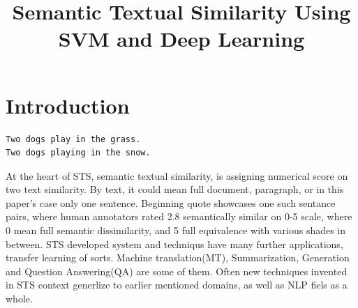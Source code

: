 \documentclass[10pt, a4paper]{article}
\title{Semantic Textual Similarity Using SVM and Deep Learning}
\begin{document}
\maketitleabstract

\section{Introduction}

\begin{verbatim}
Two dogs play in the grass.
Two dogs playing in the snow.
\end{verbatim}
At the heart of STS, semantic textual similarity, is assigning numerical score on two text similarity. By text, it could mean full document, paragraph, or in this paper's case only one sentence. Beginning quote showcases one such sentance pairs, where human annotators rated 2.8 semantically similar on 0-5 scale, where 0 mean full semantic dissimilarity, and 5 full equivalence with various shades in between. %
STS developed system and techniqus have many further applications, transfer learning of sorts. Machine translation(MT), Summarization, Generation and Question Answering(QA) are some of them. Often new techniques invented in STS context generlize to earlier mentioned domains, as well as NLP fiels as a whole.
\end{document}
